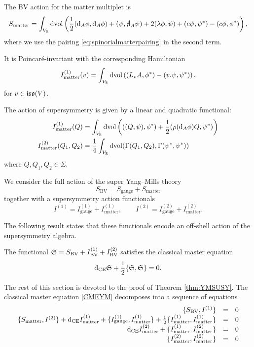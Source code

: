 \documentclass[10pt, oneside]{article}
\newcommand{\BV}{\mathrm{BV}}
\newcommand{\gauge}{\mathrm{gauge}}
\newcommand{\matter}{\mathrm{matter}}
\begin{document}
The BV action for the matter multiplet is
\[
S_{\matter} = \int_{V_\RR} \dvol \left(\frac{1}{2}  (\d_A \phi, \d_A \phi) + (\psi , \sd \d_A \psi) + 2 (\lambda\phi, \psi) + (c\psi, \psi^*) - (c\phi, \phi^*)\right),
\]
where we use the pairing \eqref{eq:spinorialmatterpairing} in the second term.

It is Poincar\'{e}-invariant with the corresponding Hamiltonian
\begin{equation}
I_{\matter}^{(1)}(v) = \int_{V_\RR}\dvol\left( (L_{v}A, \phi^*) - (v.\psi, \psi^*)\right),
\label{eq:matterPoincareaction}
\end{equation}
for $v\in\mathfrak{iso}(V)$.

The action of supersymmetry is given by a linear and quadratic functional:
\begin{align*}
I_{\matter}^{(1)} (Q) & = \int_{V_\RR}\dvol\left( ((Q, \psi), \phi^*) + \frac{1}{2}(\rho(\d_A \phi) Q, \psi^*)\right) \\
I_{\matter}^{(2)} (Q_1 , Q_2) & = \frac{1}{4}\int_{V_\RR} \dvol(\Gamma(Q_1, Q_2) , \Gamma(\psi^*, \psi^*))
\end{align*}
where $Q, Q_1,Q_2 \in \Sigma$.

We consider the full action of the super Yang--Mills theory
\[S_{\BV} = S_{\gauge} + S_{\matter}\]
together with a supersymmetry action functionals
\[I^{(1)} = I^{(1)}_{\gauge} + I^{(1)}_{\matter},\qquad I^{(2)} = I^{(2)}_{\gauge} + I^{(2)}_{\matter}.\]

The following result states that these functionals encode an off-shell action of the supersymmetry algebra.

\begin{thm}
The functional $\fS = S_{\BV} + I_{\BV}^{(1)} + I_{\BV}^{(2)}$ satisfies the classical master equation
\begin{equation}
\label{CMEYM}
{\rm d}_{\mathrm{CE}} \mathfrak S + \frac{1}{2} \{\mathfrak S, \mathfrak S\} = 0 .
\end{equation}
\label{thm:YMSUSY}
\end{thm}

The rest of this section is devoted to the proof of Theorem \ref{thm:YMSUSY}. The classical master equation \eqref{CMEYM} decomposes into a sequence of equations
\begin{equation}
\label{CMEYM2}
\begin{array}{rrrrrr}
\{S_{\BV} , I^{(1)}\} & = & 0 \\ 
\{S_{\matter}, I^{(2)}\} + \d_{\mr{CE}} I_{\matter}^{(1)} + \{I_{\gauge}^{(1)}, I_{\matter}^{(1)}\} + \frac{1}{2} \{I_{\matter}^{(1)}, I_{\matter}^{(1)}\} & = & 0 \\
\d_{\mr{CE}} I_{\matter}^{(2)} + \{I_{\matter}^{(1)}, I_{\matter}^{(2)}\} & =& 0 \\
\{I_{\matter}^{(2)}, I_{\matter}^{(2)}\} & =& 0
\end{array}
\end{equation}
\end{document}
